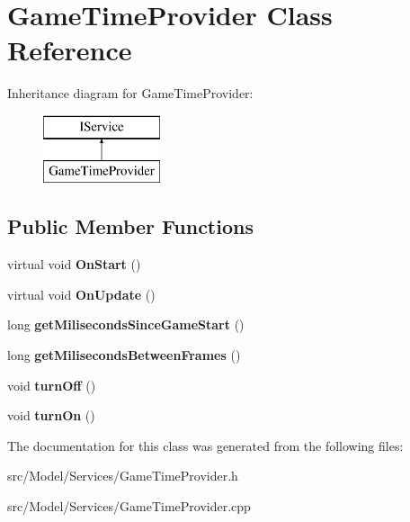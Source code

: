 \hypertarget{classGameTimeProvider}{}\section{Game\+Time\+Provider Class Reference}
\label{classGameTimeProvider}
Inheritance diagram for Game\+Time\+Provider\+:\begin{figure}[H]
\begin{center}
\leavevmode
\includegraphics[height=2.000000cm]{classGameTimeProvider}
\end{center}
\end{figure}
\subsection*{Public Member Functions}
\begin{DoxyCompactItemize}
\item 
virtual void {\bfseries On\+Start} ()\hypertarget{classGameTimeProvider_a40ab7efa253a43e6a89ef4da6301d9ca}{}\label{classGameTimeProvider_a40ab7efa253a43e6a89ef4da6301d9ca}

\item 
virtual void {\bfseries On\+Update} ()\hypertarget{classGameTimeProvider_a9c90c29786e57ce72d6ba2e3c9ff9aec}{}\label{classGameTimeProvider_a9c90c29786e57ce72d6ba2e3c9ff9aec}

\item 
long {\bfseries get\+Miliseconds\+Since\+Game\+Start} ()\hypertarget{classGameTimeProvider_af995dede8e21de41a47e8db364531e8b}{}\label{classGameTimeProvider_af995dede8e21de41a47e8db364531e8b}

\item 
long {\bfseries get\+Miliseconds\+Between\+Frames} ()\hypertarget{classGameTimeProvider_a243a98c22d23c17691dab197c23574d6}{}\label{classGameTimeProvider_a243a98c22d23c17691dab197c23574d6}

\item 
void {\bfseries turn\+Off} ()\hypertarget{classGameTimeProvider_a8bc5613dac01d7d253050cadfb47dd5f}{}\label{classGameTimeProvider_a8bc5613dac01d7d253050cadfb47dd5f}

\item 
void {\bfseries turn\+On} ()\hypertarget{classGameTimeProvider_a4120c096bdd6112e90fdc7ea8eac1d43}{}\label{classGameTimeProvider_a4120c096bdd6112e90fdc7ea8eac1d43}

\end{DoxyCompactItemize}


The documentation for this class was generated from the following files\+:\begin{DoxyCompactItemize}
\item 
src/\+Model/\+Services/Game\+Time\+Provider.\+h\item 
src/\+Model/\+Services/Game\+Time\+Provider.\+cpp\end{DoxyCompactItemize}
